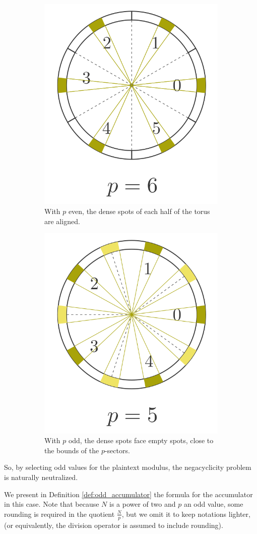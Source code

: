 \begin{figure}
	\begin{subfigure}{0.49\linewidth}
		    \centering
		\includegraphics[width=0.5\linewidth]{img/to_harmonize/torus_p_even.png}
		\caption{With $p$ even, the dense spots of each half of the torus are aligned.}
		\label{fig:torus_p_even}
	\end{subfigure}\hspace{1em}%
	\begin{subfigure}{0.49\linewidth}
		\centering
		\includegraphics[width=0.5\linewidth]{img/to_harmonize/torus_p_odd.png}
		\caption{With $p$ odd, the dense spots face empty spots, close to the bounds of the $p$-sectors.}
	\end{subfigure}
	\caption{}
	\label{fig:torus_p_even_vs_odd}
\end{figure}



So, by selecting odd values for the plaintext modulus, the negacyclicity problem is naturally neutralized.


We present in Definition \ref{def:odd_accumulator} the formula for the accumulator in this case. Note that because $N$ is a power of two and $p$ an odd value, some rounding is required in the quotient $\frac N p$, but we omit it to keep notations lighter, (or equivalently, the division operator is assumed to include rounding).

